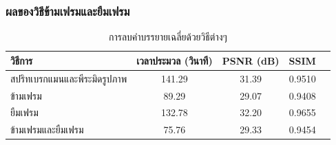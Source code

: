 \documentclass[xcolor=dvipsnames, xetex,serif]{beamer}
\numberwithin{equation}{section}
\begin{document}
    \begin{frame}
    \end{frame}
    \begin{frame}
        \frametitle{ผลของวิธีข้ามเฟรมและยืมเฟรม}
        \begin{table}[H]
            \centering
            \begin{tabular}[ht]{|l|c|c|c|c|}
                \hline
                วิธีการ  & เวลาประมวล  (วินาที) & PSNR (dB) & SSIM \\
                \hline
                สปริทเบรกแมนและพีระมิดรูปภาพ & 141.29 & 31.39  &  0.9510\\
                ข้ามเฟรม & 89.29 & 29.07 & 0.9408 \\
                ยืมเฟรม & 132.78 & 32.20 & 0.9655\\
                ข้ามเฟรมและยืมเฟรม & 75.76 & 29.33 & 0.9454 \\
                \hline
            \end{tabular}
            \caption{การลบคำบรรยายเฉลี่ยด้วยวิธีต่างๆ}
        \end{table}	
    \end{frame}
\end{document}
